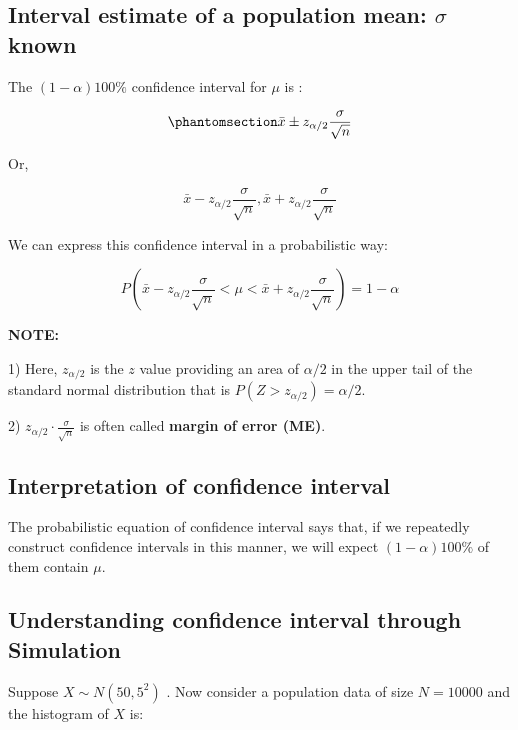 \documentclass[
  11pt,
  letterpaper,
  DIV=11,
  numbers=noendperiod]{scrreprt}
\begin{document}
\subsection{\texorpdfstring{Interval estimate of a population mean:
\(\sigma\)
known}{Interval estimate of a population mean: \textbackslash sigma known}}\label{interval-estimate-of-a-population-mean-sigma-known}

The \((1-\alpha)100\%\) confidence interval for \(\mu\) is :

\begin{equation}\phantomsection\label{eq-9.1}{\bar x \pm z_{\alpha/2} \frac{\sigma}{\sqrt n}}\end{equation}

Or,

\[\bar x-z_{\alpha/2}\frac {\sigma}{\sqrt n}, \bar x+z_{\alpha/2}\frac {\sigma}{\sqrt n}\]

We can express this confidence interval in a probabilistic way:

\[P\left( \bar x-z_{\alpha/2}\frac{\sigma}{\sqrt n}<\mu<\bar x+z_{\alpha/2}\frac{\sigma}{\sqrt n}  \right)=1-\alpha\]

\textbf{NOTE:}

1) Here, \(z_{\alpha/2}\) is the \(z\) value providing an area of
\(\alpha/2\) in the upper tail of the standard normal distribution that
is \(P(Z>z_{\alpha/2})=\alpha/2\).

2) \(z_{\alpha/2} \cdot \frac{\sigma}{\sqrt n}\) is often called
\textbf{margin of error (ME)}.

\subsection{\texorpdfstring{\textbf{Interpretation of confidence
interval}}{Interpretation of confidence interval}}\label{interpretation-of-confidence-interval}

The probabilistic equation of confidence interval says that, if we
repeatedly construct confidence intervals in this manner, we will expect
\((1-\alpha)100\%\) of them contain \(\mu\).

\subsection{Understanding confidence interval through
Simulation}\label{understanding-confidence-interval-through-simulation}

Suppose \(X\sim N(50,5^2)\) . Now consider a population data of size
\(N=10000\) and the histogram of \(X\) is:
\end{document}

